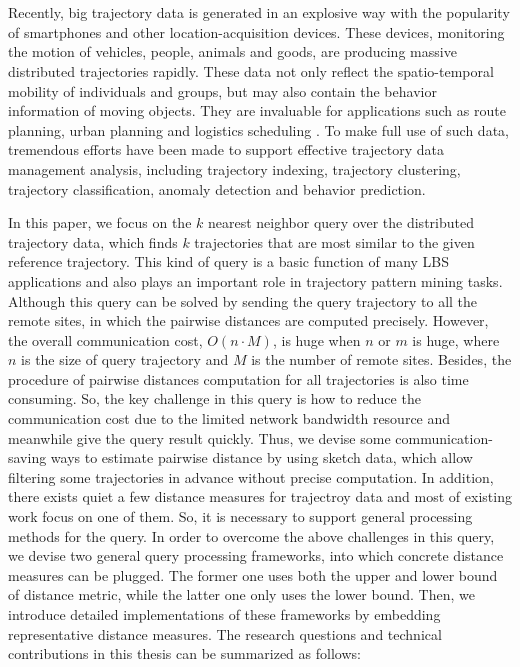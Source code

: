 \newpage
\vspace{-1cm}
\chapter*{}
\vspace{-0.5cm}

Recently, big trajectory data  is generated in an explosive way with the popularity of smartphones and other location-acquisition devices.
 These devices, monitoring the motion of vehicles, people, animals and goods, are producing massive distributed trajectories rapidly. 
 These data not only reflect the spatio-temporal mobility of individuals and groups, but may also contain the behavior information of moving objects. They are invaluable for applications such as  route planning, urban planning and logistics scheduling .
 To make full use of such data, tremendous efforts have been made to support effective trajectory data management analysis, including trajectory indexing, trajectory clustering, trajectory classification,  anomaly detection and  behavior prediction.
 
 In this paper, we focus on the $k$ nearest neighbor query over the distributed trajectory data, which finds $k$ trajectories that are most similar to the given reference trajectory. This kind of query is a basic function of many  LBS applications and  also plays an important role in  trajectory pattern mining tasks.
Although this query can be solved by sending the query trajectory to all the remote sites, in which the pairwise distances are computed precisely.
However, the overall communication cost, $O(n\cdot M)$, is huge when $n$ or $m$ is huge, where $n$ is the size of  query trajectory and $M$ is the number of remote sites. Besides, the procedure of pairwise distances computation for all trajectories is also time consuming.
So, the key challenge in this query is  how to reduce the communication cost due to the limited network bandwidth resource and meanwhile  give the query result quickly.
Thus, we devise some communication-saving ways to estimate pairwise distance by using sketch data,
 which allow filtering some trajectories in advance without precise computation.
 In addition, there exists quiet a few distance measures for trajectroy data and most of existing work focus on one of them. 
 So, it is necessary to support general processing methods for the query.
In order to overcome the above challenges in this query, we devise two general query processing frameworks, into which concrete distance measures can be plugged. 
The former one uses both the upper and lower bound of distance metric, while the latter one only uses the lower bound. Then, we introduce detailed implementations of  these frameworks by embedding  representative distance measures. The research questions and technical contributions in this thesis can be summarized as follows:


